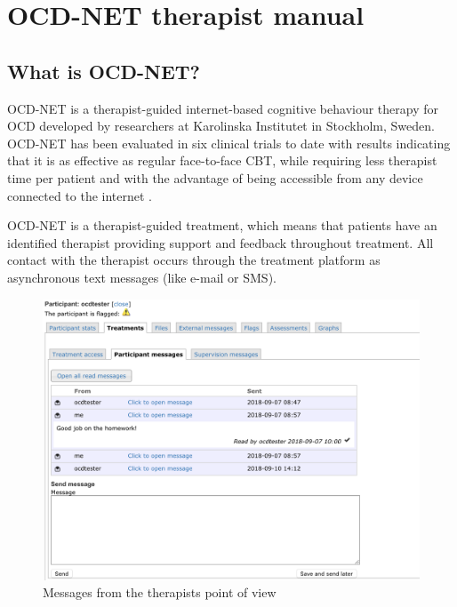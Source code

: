 \documentclass[]{book}
\theoremstyle{definition}
\theoremstyle{definition}
\theoremstyle{definition}
\theoremstyle{remark}
\begin{document}
\hypertarget{ocd-net-therapist-manual}{%
\chapter{OCD-NET therapist manual}\label{ocd-net-therapist-manual}}

\hypertarget{what-is-ocd-net}{%
\section{What is OCD-NET?}\label{what-is-ocd-net}}

OCD-NET is a therapist-guided internet-based cognitive behaviour therapy
for OCD developed by researchers at Karolinska Institutet in Stockholm,
Sweden. OCD-NET has been evaluated in six clinical trials to date with
results indicating that it is as effective as regular face-to-face CBT,
while requiring less therapist time per patient and with the advantage
of being accessible from any device connected to the internet
\citep{andersson2011a, andersson2012, andersson2014a, andersson2015a, ruck2018}.

OCD-NET is a therapist-guided treatment, which means that patients have
an identified therapist providing support and feedback throughout
treatment. All contact with the therapist occurs through the treatment
platform as asynchronous text messages (like e-mail or SMS).

\begin{figure}
\centering
\includegraphics[width=5.20833in,height=\textheight]{images/therapist-messages.png}
\caption{Messages from the therapists point of view}
\end{figure}
\end{document}
